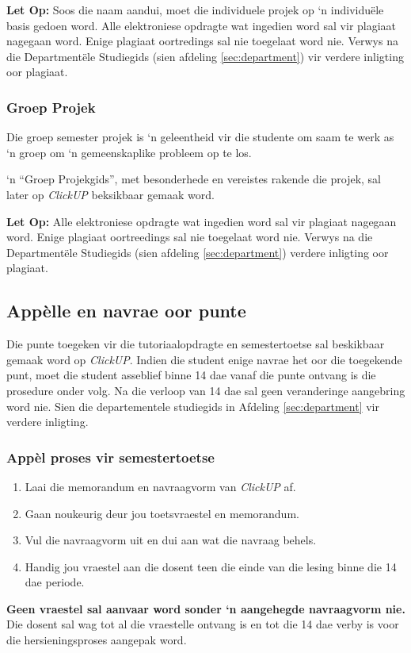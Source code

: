         \textbf{Let Op:} Soos die naam aandui, moet die individuele projek op
        `n individu\"ele basis gedoen word. Alle elektroniese opdragte wat
        ingedien word sal vir plagiaat nagegaan word. Enige plagiaat
        oortredings sal nie toegelaat word nie.  Verwys na die Department\"ele
        Studiegids (sien afdeling \ref{sec:department}) vir verdere inligting
        oor plagiaat.

    \subsubsection{Groep Projek}
        Die groep semester projek is `n geleentheid vir die studente om saam te
        werk as `n groep om `n gemeenskaplike probleem op te los.

        `n ``Groep Projekgids'', met besonderhede en vereistes rakende die
        projek, sal later op \textit{ClickUP} beksikbaar gemaak word.

        \textbf{Let Op:} Alle elektroniese opdragte wat ingedien word sal vir
        plagiaat nagegaan word. Enige plagiaat oortreedings sal nie toegelaat
        word nie.  Verwys na die Department\"ele Studiegids (sien afdeling
        \ref{sec:department}) verdere inligting oor plagiaat.

    \subsection{App\`{e}lle en navrae oor punte}
        Die punte toegeken vir die tutoriaalopdragte en semestertoetse sal
        beskikbaar gemaak word op \textit{ClickUP}. Indien die student enige
        navrae het oor die toegekende punt, moet die student asseblief binne 14
        dae vanaf die punte ontvang is die prosedure onder volg.  Na die
        verloop van 14 dae sal geen veranderinge aangebring word nie. Sien die
        departementele studiegids in Afdeling \ref{sec:department} vir verdere
        inligting.

    \subsubsection{App\`{e}l proses vir semestertoetse}
        \begin{enumerate}
            \item Laai die memorandum en navraagvorm van \textit{ClickUP} af.
            \item Gaan noukeurig deur jou toetsvraestel en memorandum.
            \item Vul die navraagvorm uit en dui aan wat die navraag behels.
            \item Handig jou vraestel aan die dosent teen die einde van die
                lesing binne die 14 dae periode.
        \end{enumerate}

        \textbf{Geen vraestel sal aanvaar word sonder `n aangehegde navraagvorm
        nie.}  Die dosent sal wag tot al die vraestelle ontvang is en tot die
        14 dae verby is voor die hersieningsproses aangepak word.
